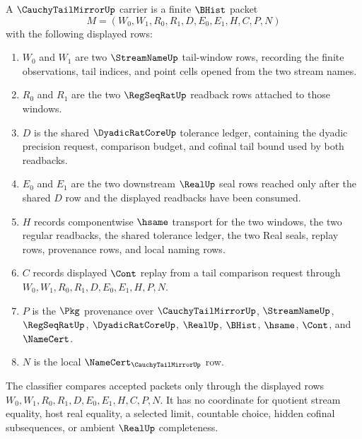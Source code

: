 \begin{definition}
\label{def:cauchy-tail-mirror-carrier}
A $\CauchyTailMirrorUp$ carrier is a finite $\BHist$ packet
$$
M=(W_0,W_1,R_0,R_1,D,E_0,E_1,H,C,P,N)
$$
with the following displayed rows:
\begin{enumerate}
\item $W_0$ and $W_1$ are two $\StreamNameUp$ tail-window rows, recording the finite observations, tail indices, and point cells opened from the two stream names.
\item $R_0$ and $R_1$ are the two $\RegSeqRatUp$ readback rows attached to those windows.
\item $D$ is the shared $\DyadicRatCoreUp$ tolerance ledger, containing the dyadic precision request, comparison budget, and cofinal tail bound used by both readbacks.
\item $E_0$ and $E_1$ are the two downstream $\RealUp$ seal rows reached only after the shared $D$ row and the displayed readbacks have been consumed.
\item $H$ records componentwise $\hsame$ transport for the two windows, the two regular readbacks, the shared tolerance ledger, the two Real seals, replay rows, provenance rows, and local naming rows.
\item $C$ records displayed $\Cont$ replay from a tail comparison request through $W_0,W_1,R_0,R_1,D,E_0,E_1,H,P,N$.
\item $P$ is the $\Pkg$ provenance over $\CauchyTailMirrorUp$, $\StreamNameUp$, $\RegSeqRatUp$, $\DyadicRatCoreUp$, $\RealUp$, $\BHist$, $\hsame$, $\Cont$, and $\NameCert$.
\item $N$ is the local $\NameCert_{\CauchyTailMirrorUp}$ row.
\end{enumerate}
The classifier compares accepted packets only through the displayed rows $W_0,W_1,R_0,R_1,D,E_0,E_1,H,C,P,N$. It has no coordinate for quotient stream equality, host real equality, a selected limit, countable choice, hidden cofinal subsequences, or ambient $\RealUp$ completeness.
\end{definition}

